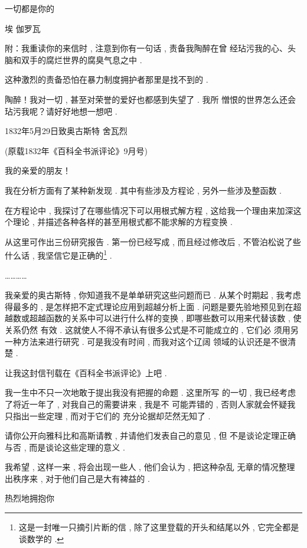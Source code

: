 \begin{flushright}
	一切都是你的

埃 \textbullet 伽罗瓦
\end{flushright}

附：我重读你的来信时 , 注意到你有一句话 , 责备我陶醉在曾 经玷污我的心、头脑和双手的腐烂世界的腐臭气息之中 . 

这种激烈的责备恐怕在暴力制度拥护者那里是找不到的 . 

陶醉！我对一切 , 甚至对荣誉的爱好也都感到失望了 . 我所 憎恨的世界怎么还会玷污我呢？请好好地想一想吧 . 

\begin{flushright}
	1832年5月29日致奥古斯特 \textbullet 舍瓦烈

(原载1832年《百科全书派评论》9月号) 
\end{flushright}

我的亲爱的朋友！

我在分析方面有了某种新发现 . 其中有些涉及方程论 , 另外一些涉及整函数 . 

在方程论中 , 我探讨了在哪些情况下可以用根式解方程 , 这给我一个理由来加深这个理论 , 并描述各种各样的甚至用根式都不能求解的方程变换 . 

从这里可作出三份研究报告 . 第一份已经写成 , 而且经过修改后 , 不管泊松说了些什么话 , 我坚信它是正确的\footnote{这是一封唯一只摘引片断的信 , 除了这里登载的开头和结尾以外 , 它完全都是 谈数学的 . } . 

…………

我亲爱的奥古斯特 , 你知道我不是单单研究这些问题而已 .  从某个时期起 , 我考虑得最多的 , 是怎样把不定式理论应用到超越分析上面 . 问题是要先验地预见到在超越数或超越函数的关系中可以进行什么样的变换 , 即哪些数可以用来代替该数 , 使关系仍然 有效 . 这就使人不得不承认有很多公式是不可能成立的 , 它们必 须用另一种方法来进行研究 . 可是我没有时间 , 而我对这个辽阔 领域的认识还是不很清楚 . 

让我这封信刊载在《百科全书派评论》上吧 . 

我一生中不只一次地敢于提出我没有把握的命题 . 这里所写 的一切 , 我已经考虑了将近一年了 , 对我自己的需要讲来 , 我是不 可能弄错的 , 否则人家就会怀疑我只指出一些定理 , 而对于它们的 充分论据却茫然无知了 . 

请你公开向雅科比和高斯请教 , 并请他们发表自己的意见 , 但 不是谈论定理正确与否 , 而是谈论这些定理的意义 . 

我希望 , 这样一来 , 将会出现一些人 , 他们会认为 , 把这种杂乱 无章的情况整理出秩序来 , 对于他们自己是大有裨益的 . 

热烈地拥抱你

